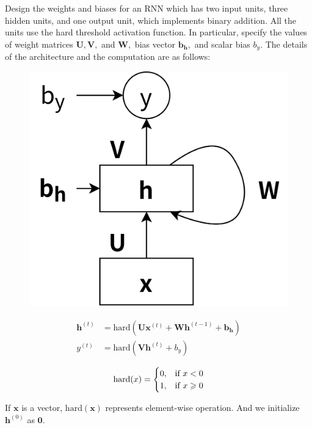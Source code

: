 \documentclass{article}
\begin{document}
Design the weights and biases for an RNN which has two input units, three hidden units, and one output unit, which implements binary addition. All the units use the hard threshold activation function. In particular, specify the values of weight matrices \(\bm{U}, \bm{V},\) and \(\bm{W},\) bias vector \(\bm{b}_{\bm{h}},\) and scalar bias \(b_{y}\). The details of the architecture and the computation are as follows:
\begin{figure}[!ht]
   \centering
   \includegraphics[scale=0.5]{fig2.png}
   \label{fig:1_2}
\end{figure}
\begin{equation}
  \begin{aligned}
    \bm{h}^{(t)} &= \mathrm{hard}(\bm{U}\bm{x}^{(t)} + \bm{W}\bm{h}^{(t-1)} + \bm{b}_{\bm{h}}) \\
    y^{(t)} &= \mathrm{hard}(\bm{V}\bm{h}^{(t)} + b_{y}) \\
  \end{aligned}
\end{equation}
\begin{equation}
  \mathrm{hard}(x)=
  \begin{cases}
    0, &\text{if}~x<0 \\
    1, &\text{if}~x\geqslant0 \\
  \end{cases}
\end{equation}

If $\bm{x}$ is a vector, $\mathrm{hard}(\bm{x})$ represents element-wise operation. And we initialize $\bm{h}^{(0)}$ as $\bm{0}$.
\end{document}
